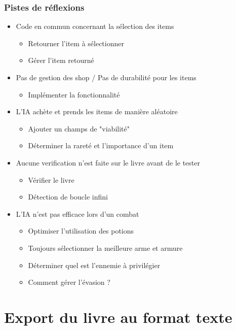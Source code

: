 \documentclass[beamer]{BetterDocument}
\begin{document}
	\begin{frame}
		\frametitle{Pistes de réflexions}

		\begin{itemize}
			\item{Code en commun concernant la sélection des items}
			\begin{itemize}
				\item{Retourner l'item à sélectionner}
				\item{Gérer l'item retourné}
			\end{itemize}

			\item{Pas de gestion des shop / Pas de durabilité pour les items}
			\begin{itemize}
				\item{Implémenter la fonctionnalité}
			\end{itemize}

			\item{L'IA achète et prends les items de manière aléatoire}
			\begin{itemize}
				\item{Ajouter un champs de "viabilité"}
				\item{Déterminer la rareté et l'importance d'un item}
			\end{itemize}

			\item{Aucune verification n'est faite sur le livre avant de le tester}
			\begin{itemize}
				\item{Vérifier le livre}
				\item{Détection de boucle infini}
			\end{itemize}

			\item{L'IA n'est pas efficace lors d'un combat}
			\begin{itemize}
				\item{Optimiser l'utilisation des potions}
				\item{Toujours sélectionner la meilleure arme et armure}
				\item{Déterminer quel est l'ennemie à privilégier}
				\item{Comment gérer l'évasion ?}
			\end{itemize}
		\end{itemize}
	\end{frame}

	\section{Export du livre au format texte}
\end{document}
